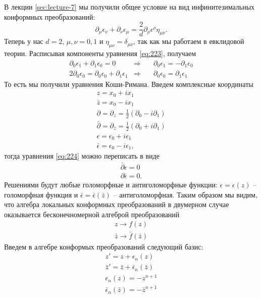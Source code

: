 \documentclass[a4paper,12pt]{article}
\theoremstyle{definition}
\theoremstyle{definition}
\theoremstyle{definition}
\begin{document}
В лекции \ref{sec:lecture-7} мы получили общее условие на вид инфинитезимальных конформных преобразований:
\begin{equation}
  \label{eq:223}
  \partial_{\mu}\epsilon_{\nu}+\partial_{\nu}\epsilon_{\mu}=\frac{2}{d} \partial_{\rho}\epsilon^{\rho} \eta_{\mu\nu}.
\end{equation}
Теперь у нас $d=2$, $\mu,\nu=0,1$ и $\eta_{\mu\nu}=\delta_{\mu\nu}$, так как мы работаем в евклидовой теории. Расписывая компоненты уравнения \eqref{eq:223}, получаем
\begin{eqnarray}
  \label{eq:224}
  \partial_{0} \epsilon_{1}+ \partial_{1}\epsilon_{0}=0& \Rightarrow & \quad\partial_{0} \epsilon_{1}=- \partial_{1}\epsilon_{0}\\
  2\partial_{0}\epsilon_{0}=\partial_{0}\epsilon_{0}+\partial_{1}\epsilon_{1}& \Rightarrow& \quad \partial_{0} \epsilon_{0}= \partial_{1}\epsilon_{1}
\end{eqnarray}
То есть мы получили уравнения Коши-Римана. Введем комплексные координаты
\begin{eqnarray}
  \label{eq:225}
  z=x_{0}+i x_{1}\\
  \bar z = x_{0}-i x_{1}\\
  \partial = \partial_{z}=\frac{1}{2}(\partial_{0}-i\partial_{1}) \\
  \bar \partial=\partial_{\bar z}=\frac{1}{2} (\partial_{0}+i \partial_{1})\\
  \epsilon=\epsilon_{0}+i \epsilon_{1}\\
  \bar \epsilon=\epsilon_{0}-i \epsilon_{1}, 
\end{eqnarray}
тогда уравнения \eqref{eq:224} можно переписать в виде
\begin{eqnarray}
  \label{eq:226}
 \bar \partial \epsilon=0\\
  \partial \bar \epsilon=0.
\end{eqnarray}
Решениями будут любые голоморфные и антиголоморфные функции: $\epsilon=\epsilon(z)$ -- голоморфная функция и $\bar \epsilon=\bar \epsilon(\bar z)$ -- антиголоморфная. Таким образом мы видим, что алгебра локальных конформных преобразований в двумерном случае оказывается бесконечномерной алгеброй преобразований
\begin{eqnarray}
  \label{eq:227}
  z\to f(z)\\
  \bar z \to \bar f(\bar z)
\end{eqnarray}
Введем в алгебре конформых преобразований следующий базис:
\begin{eqnarray}
  \label{eq:228}
  z'=z+\epsilon_{n}(z)\\
  \bar z'=\bar z+\bar \epsilon_{n}(\bar z)\\
  \epsilon_{n}(z)= -z^{n+1}\\
  \bar \epsilon_{n}(\bar z)=-\bar z^{n+1}
\end{eqnarray}
\end{document}
